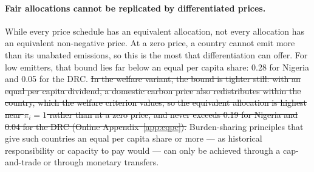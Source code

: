 \documentclass[12pt,english]{article}
\theoremstyle{remark}
\providecommand{\DIFdeltex}[1]{{\protect\color{red}\sout{#1}}}                      %
\providecommand{\DIFdelbegin}{} %
\providecommand{\DIFdelend}{} %
\providecommand{\DIFdel}[1]{\texorpdfstring{\DIFdeltex{#1}}{}} %
\newcommand{\DIFscaledelfig}{0.5}
\newlength{\DIFdelgraphicswidth} %
\newlength{\DIFdelgraphicsheight} %
\newcommand{\DIFdelincludegraphics}[2][]{%
\sbox{\DIFdelgraphicsbox}{\DIFOincludegraphics[#1]{#2}}%
\settoboxwidth{\DIFdelgraphicswidth}{\DIFdelgraphicsbox} %
\settoboxtotalheight{\DIFdelgraphicsheight}{\DIFdelgraphicsbox} %
\scalebox{\DIFscaledelfig}{%
\parbox[b]{\DIFdelgraphicswidth}{\usebox{\DIFdelgraphicsbox}\\[-\baselineskip] \rule{\DIFdelgraphicswidth}{0em}}\llap{\resizebox{\DIFdelgraphicswidth}{\DIFdelgraphicsheight}{%
\setlength{\unitlength}{\DIFdelgraphicswidth}%
\begin{picture}(1,1)%
\thicklines\linethickness{2pt} %
{\color[rgb]{1,0,0}\put(0,0){\framebox(1,1){}}}%
{\color[rgb]{1,0,0}\put(0,0){\line( 1,1){1}}}%
{\color[rgb]{1,0,0}\put(0,1){\line(1,-1){1}}}%
\end{picture}%
}\hspace*{3pt}}} %
} %
\DeclareRobustCommand{\DIFdelbegin}{\DIFOdelbegin \let\includegraphics\DIFdelincludegraphics} %
\DeclareRobustCommand{\DIFdelend}{\DIFOaddend \let\includegraphics\DIFOincludegraphics} %
\begin{document}
\paragraph{Fair allocations cannot be replicated by differentiated prices.} 
While every price schedule has an equivalent allocation, not every allocation has an equivalent non-negative price. At a zero price, a country cannot emit more than its unabated emissions, so this is the most that differentiation can offer. %
For low emitters, that bound lies far below an equal per capita share: 0.28 for Nigeria and 0.05 for the DRC. 
\DIFdelbegin \DIFdel{In the welfare variant, the bound is tighter still: with an equal per capita dividend, a domestic carbon price also redistributes within the country, which the welfare criterion values, so the equivalent allocation is highest near $\pi_i=1$ rather than at a zero price, and never exceeds 0.19 for Nigeria and 0.04 for the DRC (Online Appendix~\ref{app:eqpc}). 
}\DIFdelend %
Burden-sharing principles that give such countries an equal per capita share or more --- as historical responsibility or capacity to pay would --- can only be achieved through a cap-and-trade or through monetary transfers. 
\end{document}
